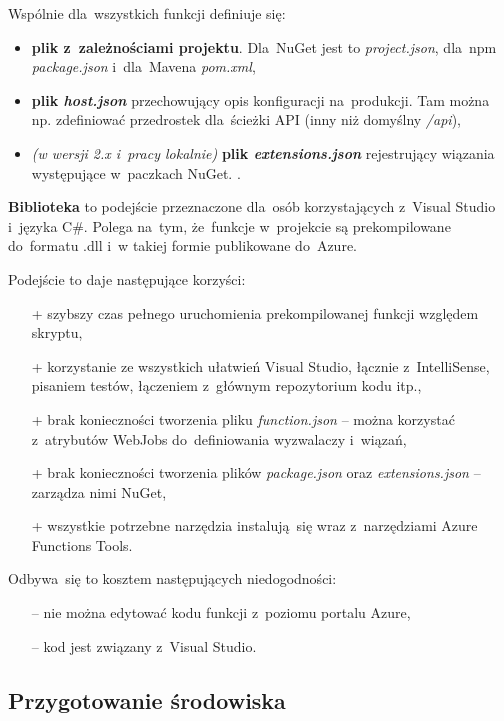 \documentclass[12pt,a4paper,twoside,titlepage,openright]{book}
\begin{document}
Wspólnie dla~wszystkich funkcji definiuje się:
\begin{itemize}
\item \textbf{plik z~zależnościami projektu}. Dla~NuGet jest to \textit{project.json}, dla~npm \textit{package.json} i~dla~Mavena \textit{pom.xml},
\item \textbf{plik \textit{host.json}} przechowujący opis konfiguracji na~produkcji. Tam można np. zdefiniować przedrostek dla~ścieżki API (inny niż domyślny \textit{/api}),
\item \textit{(w wersji 2.x i~pracy lokalnie)} \textbf{plik \textit{extensions.json}} rejestrujący wiązania występujące w~paczkach NuGet. \cite{siteAppCSharpScript}.
\end{itemize}

\textbf{Biblioteka} to podejście przeznaczone dla~osób korzystających z~Visual Studio i~języka C\#. Polega na~tym, że~funkcje w~projekcie są prekompilowane do~formatu .dll i~w takiej formie publikowane do~Azure. 

Podejście to daje następujące korzyści: \cite{siteAppLibrary}
\begin{itemize}
\item[+] szybszy czas pełnego uruchomienia prekompilowanej funkcji względem skryptu,
\item[+] korzystanie ze wszystkich ułatwień Visual Studio, łącznie z~IntelliSense, pisaniem testów, łączeniem z~głównym repozytorium kodu itp.,
\item[+] brak konieczności tworzenia pliku \textit{function.json} -- można korzystać z~atrybutów WebJobs do~definiowania wyzwalaczy i~wiązań,
\item[+] brak konieczności tworzenia plików \textit{package.json} oraz \textit{extensions.json} -- zarządza nimi NuGet,
\item[+] wszystkie potrzebne narzędzia instalują~się wraz z~narzędziami Azure Functions Tools.
\end{itemize}
Odbywa~się to kosztem następujących niedogodności:
\begin{itemize}
\item[--] nie można edytować kodu funkcji z~poziomu portalu Azure,
\item[--] kod jest związany z~Visual Studio.
\end{itemize}


\subsection{Przygotowanie środowiska}
\end{document}
